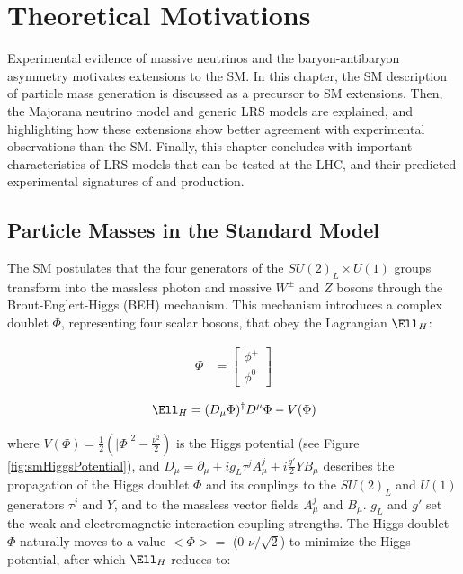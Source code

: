 \chapter{Theoretical Motivations}
\label{wrBosonAndHeavyNu}
Experimental evidence of massive neutrinos and the baryon-antibaryon asymmetry motivates extensions to the SM.  
In this chapter, the SM description of particle mass generation is discussed as a precursor to SM extensions.  
Then, the Majorana neutrino model and generic LRS models are explained, and highlighting how these extensions 
show better agreement with experimental observations than the SM.  Finally, this chapter concludes with 
important characteristics of LRS models that can be tested at the LHC, and their predicted experimental signatures 
of \WR and \nul production.


\section{Particle Masses in the Standard Model}
\label{sec:massInSM}
The SM postulates that the four generators of the $SU(2)_{L} \times U(1)$ groups transform into the massless 
photon and massive $W^{\pm}$ and $Z$ bosons through the Brout-Englert-Higgs (BEH) mechanism.  This mechanism 
introduces a complex doublet $\Phi$, representing four scalar bosons, that obey the Lagrangian $\Ell_{H}$:

\begin{align}
	\Phi &= \begin{bmatrix}
	\phi^{+} \\
	\phi^{0}
	\end{bmatrix}
\end{align}

\begin{equation}
	\Ell_{H} = (D_{\mu}\Phi)^{\dagger}D^{\mu}\Phi - V(\Phi)
\end{equation}

where $V(\Phi) = \frac{1}{2}(|\Phi|^{2} - \frac{\nu^{2}}{2})$ is the Higgs potential (see Figure \ref{fig:smHiggsPotential}), and 
$D_{\mu} = \partial_{\mu} + ig_{L}\tau^{j}A^{j}_{\mu} + i\frac{g'}{2}YB_{\mu}$ describes the propagation 
of the Higgs doublet $\Phi$ and its couplings to the $SU(2)_{L}$ and $U(1)$ generators $\tau^{j}$ and $Y$, 
and to the massless vector fields $A^{j}_{\mu}$ and $B_{\mu}$.  $g_{L}$ and 
$g'$ set the weak and electromagnetic interaction coupling strengths.  The Higgs doublet $\Phi$ naturally 
moves to a value $<\Phi> =$ (0  $\nu/\sqrt{2}$) to minimize the Higgs potential, after which $\Ell_{H}$ reduces 
to:

